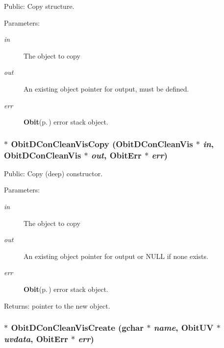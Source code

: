 Public: Copy structure. 

\begin{Desc}
\item[Parameters:]
\begin{description}
\item[{\em in}]The object to copy \item[{\em out}]An existing object pointer for output, must be defined. \item[{\em err}]{\bf Obit}{\rm (p.\,\pageref{structObit})} error stack object. \end{description}
\end{Desc}
\subsubsection{$\ast$ Obit\-DCon\-Clean\-Vis\-Copy ({\bf Obit\-DCon\-Clean\-Vis} $\ast$ {\em in}, {\bf Obit\-DCon\-Clean\-Vis} $\ast$ {\em out}, {\bf Obit\-Err} $\ast$ {\em err})}\label{ObitDConCleanVis_8c_a14}


Public: Copy (deep) constructor. 

\begin{Desc}
\item[Parameters:]
\begin{description}
\item[{\em in}]The object to copy \item[{\em out}]An existing object pointer for output or NULL if none exists. \item[{\em err}]{\bf Obit}{\rm (p.\,\pageref{structObit})} error stack object. \end{description}
\end{Desc}
\begin{Desc}
\item[Returns:]pointer to the new object. \end{Desc}
\subsubsection{$\ast$ Obit\-DCon\-Clean\-Vis\-Create (gchar $\ast$ {\em name}, {\bf Obit\-UV} $\ast$ {\em uvdata}, {\bf Obit\-Err} $\ast$ {\em err})}\label{ObitDConCleanVis_8c_a16}



